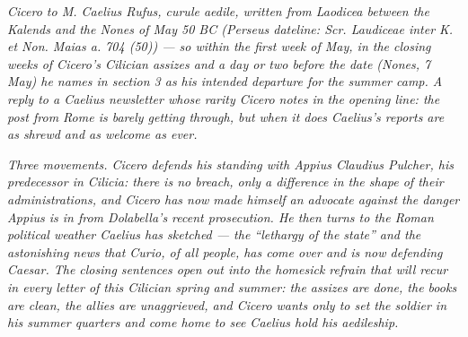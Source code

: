
\textit{Cicero to M. Caelius Rufus, curule aedile,
written from Laodicea between the Kalends and the Nones
of May 50 BC (Perseus dateline: \textit{Scr. Laudiceae
inter K. et Non. Maias a. 704 (50)}) --- so within the
first week of May, in the closing weeks of Cicero's
Cilician assizes and a day or two before the date
(Nones, 7 May) he names in section 3 as his intended
departure for the summer camp. A reply to a Caelius
newsletter whose rarity Cicero notes in the opening
line: the post from Rome is barely getting through, but
when it does Caelius's reports are as shrewd and as
welcome as ever.}

\textit{Three movements. Cicero defends his standing
with Appius Claudius Pulcher, his predecessor in
Cilicia: there is no breach, only a difference in the
shape of their administrations, and Cicero has now made
himself an advocate against the danger Appius is in
from Dolabella's recent prosecution. He then turns to
the Roman political weather Caelius has sketched ---
the ``lethargy of the state'' and the astonishing news
that Curio, of all people, has come over and is now
defending Caesar. The closing sentences open out into
the homesick refrain that will recur in every letter
of this Cilician spring and summer: the assizes are
done, the books are clean, the allies are unaggrieved,
and Cicero wants only to set the soldier in his summer
quarters and come home to see Caelius hold his
aedileship.}
